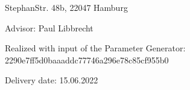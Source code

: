 \vspace*{-6mm}

\begin{large} 
\begin{center}
StephanStr. 48b, 22047 Hamburg
\end{center}
\end{large} 

\vspace*{-6mm}


\vspace*{5mm}

\begin{large} 
\begin{center}
Advisor: Paul Libbrecht
\end{center}
\end{large} 

\begin{large} 
\begin{center}
Realized with input of the Parameter Generator: 2290e7ff5d0baaaddc77746a296e78c85cf955b0
\end{center}
\end{large} 



\vspace*{-6mm}

\begin{large} 
\begin{center}
Delivery date: 15.06.2022
\end{center}
\end{large} 


\pagestyle{empty} %

